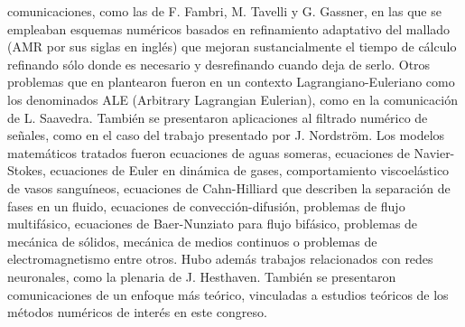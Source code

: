\documentclass[twoside]{article}
\begin{document}
comunicaciones, como las de F. Fambri, M. Tavelli y G. Gassner, en las que se empleaban esquemas numéricos basados en refinamiento adaptativo del mallado (AMR por sus siglas en inglés) que mejoran sustancialmente el tiempo de cálculo refinando sólo donde es necesario y desrefinando cuando deja de serlo. Otros problemas que en plantearon fueron en un contexto Lagrangiano-Euleriano como los denominados ALE (Arbitrary Lagrangian Eulerian), como en la comunicación de L. Saavedra. También se presentaron aplicaciones al filtrado numérico de señales, como en el caso del trabajo presentado por J. Nordström. Los modelos matemáticos tratados fueron ecuaciones de aguas someras, ecuaciones de Navier-Stokes, ecuaciones de Euler en dinámica de gases, comportamiento viscoelástico de vasos sanguíneos, ecuaciones de Cahn-Hilliard que describen la separación de fases en un fluido, ecuaciones de convección-difusión, problemas de flujo multifásico, ecuaciones de Baer-Nunziato para flujo bifásico, problemas de mecánica de sólidos, mecánica de medios continuos o problemas de electromagnetismo entre otros. Hubo además trabajos relacionados con redes neuronales, como la plenaria de J. Hesthaven.  También se presentaron comunicaciones de un enfoque más teórico, vinculadas a estudios teóricos de los métodos numéricos de interés en este congreso.
%
\end{document}
